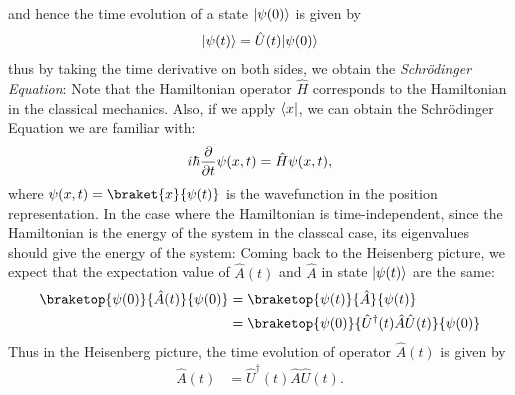 and hence the time evolution of a state $\lvert\psi(0)\rangle$ is given by
\begin{align}
  \lvert\psi(t)\rangle = \hat{U}(t) \lvert\psi(0)\rangle
\end{align}
thus by taking the time derivative on both sides, we obtain the \emph{Schrödinger Equation}:
Note that the Hamiltonian operator $\hat{H}$ corresponds to the Hamiltonian in the classical mechanics.
Also, if we apply $\langle x\rvert$, we can obtain the Schrödinger Equation we are familiar with:
\begin{align}
  i \hbar \pdv{}{t} \psi(x, t) = \hat{H} \psi(x, t),
\end{align}
where $\psi(x, t) = \braket{x}{\psi(t)}$ is the wavefunction in the position representation.
In the case where the Hamiltonian is time-independent, since the Hamiltonian is the energy of the system in the classcal case, its eigenvalues should give the energy of the system:
Coming back to the Heisenberg picture, we expect that the expectation value of $\hat{A}(t)$ and $\hat{A}$ in state $\lvert\psi(t)\rangle$ are the same:
\begin{align}
  \braketop{\psi(0)}{\hat{A}(t)}{\psi(0)} & = \braketop{\psi(t)}{\hat{A}}{\psi(t)}                               \\
                                          & = \braketop{\psi(0)}{\hat{U}^\dagger(t) \hat{A} \hat{U}(t)}{\psi(0)}
\end{align}
Thus in the Heisenberg picture, the time evolution of operator $\hat{A}(t)$ is given by
\begin{align}
  \hat{A}(t) & = \hat{U}^\dagger(t) \hat{A} \hat{U}(t).
\end{align}